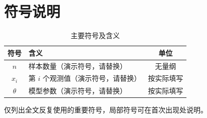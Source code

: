 \section{符号说明}
\begin{table}[htbp]
  \centering
  \caption{主要符号及含义}
  \label{tab:notations}
  \begin{tabularx}{\textwidth}{cXc}
    \toprule
    符号 & 含义 & 单位 \\
    \midrule
    $n$ & 样本数量（演示符号，请替换） & 无量纲 \\
    $x_i$ & 第 $i$ 个观测值（演示符号，请替换） & 按实际填写 \\
    $\theta$ & 模型参数（演示符号，请替换） & 按实际填写 \\
    \bottomrule
  \end{tabularx}
\end{table}
仅列出全文反复使用的重要符号，局部符号可在首次出现处说明。
